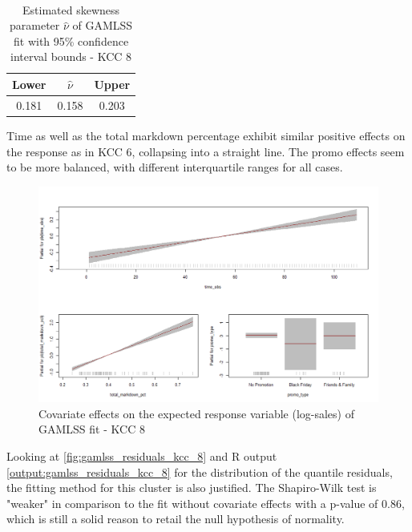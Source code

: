 \begin{table}[H]
\setlength\arrayrulewidth{1pt}  
\centering
\begin{adjustbox}{max width=\textwidth}\
\begin{tabular}{|c|c|c|}
\hline
\rowcolor{lightgray} 
Lower & $\hat{\nu}$ & Upper \\ \hline
0.181        & 0.158           & 0.203        \\ \hline
\end{tabular}
\end{adjustbox}
\caption{Estimated skewness parameter $\hat{\nu}$ of GAMLSS fit with 95\% confidence interval bounds - KCC 8}
\label{tab:nu_ci_kcc_8}
\end{table}



Time as well as the total markdown percentage exhibit similar positive effects on the response as in \ac{KCC} 6, collapsing into a straight line. The promo effects seem to be more balanced, with different interquartile ranges for all cases.
\\


\begin{figure}[H]
\centering
  \includegraphics[width=0.95\linewidth]{figures/gamlss_effects_kcc_8.png}
  \caption{Covariate effects on the expected response variable (log-sales) of GAMLSS fit - KCC 8}
  \label{fig:gamlss_effects_kcc_8}
\end{figure}



Looking at \autoref{fig:gamlss_residuals_kcc_8} and R output \ref{output:gamlss_residuals_kcc_8} for the distribution of the quantile residuals, the fitting method for this cluster is also justified. The Shapiro-Wilk test is "weaker" in comparison to the fit without covariate effects with a p-value of 0.86, which is still a solid reason to retail the null hypothesis of normality.



